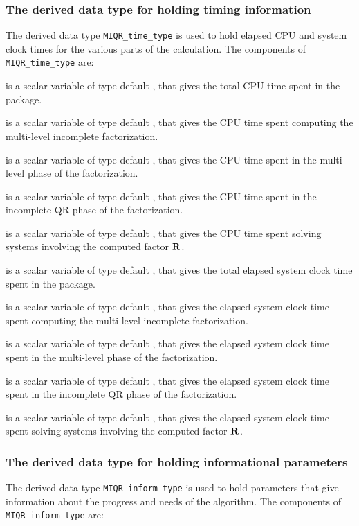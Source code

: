 \documentclass{galahad}
\newcommand{\packagename}{MIQR}
\begin{document}
\subsubsection{The derived data type for holding timing
 information}\label{typetime}
The derived data type
{\tt \packagename\_time\_type}
is used to hold elapsed CPU and system clock times for the various parts of
the calculation. The components of
{\tt \packagename\_time\_type}
are:
\begin{description}
 is a scalar variable of type default \realdp, that gives
 the total CPU time spent in the package.

 is a scalar variable of type default \realdp, that gives
 the CPU time spent computing the multi-level incomplete factorization.

 is a scalar variable of type default \realdp, that gives
 the CPU time spent in the multi-level phase of the factorization.

 is a scalar variable of type default \realdp, that gives
 the CPU time spent in the incomplete QR phase of the factorization.

 is a scalar variable of type default \realdp, that gives
 the CPU time spent  solving systems involving the computed factor ${\mathbf{R}}$.

 is a scalar variable of type default \realdp, that gives
 the total elapsed system clock time spent in the package.

 is a scalar variable of type default \realdp, that gives
 the elapsed system clock time spent computing the multi-level incomplete
factorization.

 is a scalar variable of type default \realdp, that gives
 the elapsed system clock time spent in the multi-level phase of the
factorization.

 is a scalar variable of type default \realdp, that gives
the elapsed system clock time spent in the incomplete QR phase of the
factorization.

 is a scalar variable of type default \realdp, that gives
 the elapsed system clock time spent solving systems involving the computed
factor ${\mathbf{R}}$.

\end{description}



\subsubsection{The derived data type for holding informational
 parameters}\label{typeinform}
The derived data type
{\tt \packagename\_inform\_type}
is used to hold parameters that give information about the progress and needs
of the algorithm. The components of
{\tt \packagename\_inform\_type}
are:
\end{document}
